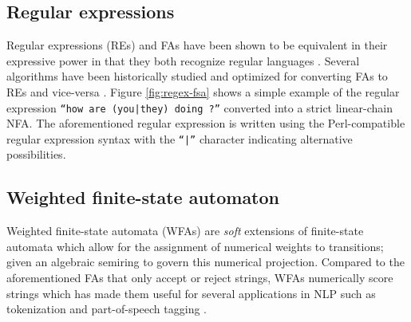 \subsection{Regular expressions}

Regular expressions (REs) and FAs have been shown to be equivalent in their
expressive power in that they both recognize regular languages
\citep{sipser1996introduction}. Several algorithms have been historically
studied and optimized for converting FAs to REs and vice-versa
\citep{mcnaughton1960regular,thompson1968programming}. Figure
\ref{fig:regex-fsa} shows a simple example of the regular expression
\texttt{``how are (you|they) doing ?''} converted into a strict linear-chain
NFA. The aforementioned regular expression is written using the Perl-compatible
regular expression syntax with the \texttt{``|''} character indicating alternative possibilities.

\subsection{Weighted finite-state automaton}

Weighted finite-state automata (WFAs) are \textit{soft} extensions of
finite-state automata which allow for the assignment of numerical weights to
transitions; given an algebraic semiring to govern this numerical projection.
Compared to the aforementioned FAs that only accept or reject strings, WFAs
numerically score strings which has made them useful for several applications in
NLP such as tokenization and part-of-speech tagging \citep{maletti2017survey}.

